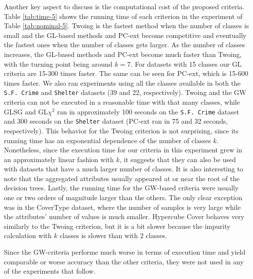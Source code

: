 Another key aspect to discuss is the computational cost of the proposed criteria. Table \ref{tab:time-5} shows the running time of each criterion in the experiment of Table \ref{tab:nominal-5}. Twoing is the fastest method when the number of classes is small and the GL-based methods  and PC-ext become competitive and eventually the
fastest ones when the number of classes gets larger. As the number of classes increases, the GL-based methods and PC-ext become much faster than Twoing, with the turning point being around $k=7$. For datasets with 15 classes our GL criteria are 15-300 times faster. The same can be seen for PC-ext, which is 15-600 times faster. We also ran experiments using all the classes available in both the {\tt S.F. Crime} and {\tt Shelter} datasets (39 and 22, respectively). Twoing and the GW criteria can not be executed in a reasonable time with that many classes, while GLSG and GL$\chi^2$ ran in approximately 100 seconds on the {\tt S.F. Crime} dataset and  300 seconds on the {\tt Shelter} dataset (PC-ext ran in 75 and 32 seconds, respectively). This behavior for the Twoing criterion is not surprising, since its running time has an exponential dependence of the number of classes $k$. Nonetheless, since the execution time for our criteria in this experiment grew in an approximately linear fashion with $k$, it suggests that they can also be used with datasets that have a much larger number of classes. It is also interesting to note that the aggregated attributes usually appeared at or near the root of the decision trees. Lastly, the running time for the GW-based criteria were usually one or two orders of magnitude larger than the others. The only clear exception was in the CoverType dataset, where the number of samples is very large while the attributes’ number of values is much smaller. Hypercube Cover behaves very similarly to the Twoing criterion, but it is a bit slower because the impurity calculation with $k$ classes is slower than with $2$ classes.

Since the GW-criteria performe much worse in terms of execution time and yield comparable or worse accuracy than the other criteria, they were not used in any of the experiments that follow.

